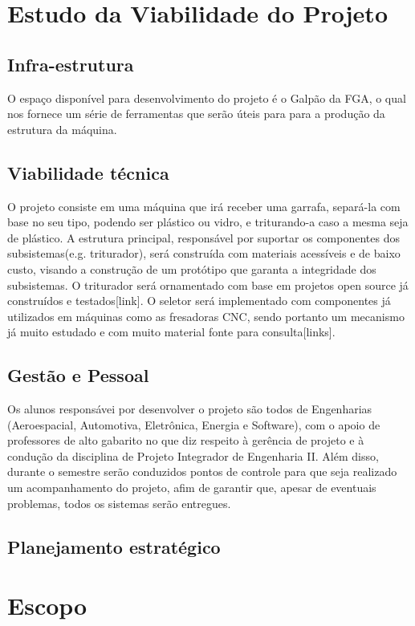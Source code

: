 \section{Estudo da Viabilidade do Projeto}

\subsection{Infra-estrutura}
    O espaço disponível para desenvolvimento do projeto é o Galpão da FGA, o qual nos fornece um série de ferramentas que serão úteis para para a produção da estrutura da máquina.

\subsection{Viabilidade técnica}
    O projeto consiste em uma máquina que irá receber uma garrafa, separá-la com base no seu tipo, podendo ser plástico ou vidro, e triturando-a caso a mesma seja de plástico. A estrutura principal, responsável por suportar os componentes dos subsistemas(e.g. triturador), será construída com materiais acessíveis e de baixo custo, visando a construção de um protótipo que garanta a integridade dos subsistemas. O triturador será ornamentado com base em projetos open source já construídos e testados[link]. O seletor será implementado com componentes já utilizados em máquinas como as fresadoras CNC, sendo portanto um mecanismo já muito estudado e com muito material fonte para consulta[links].

\subsection{Gestão e Pessoal}
    Os alunos responsávei por desenvolver o projeto são todos de Engenharias (Aeroespacial, Automotiva, Eletrônica, Energia e Software), com o apoio de professores de alto gabarito no que diz respeito à gerência de projeto e à condução da disciplina de Projeto Integrador de Engenharia II. Além disso, durante o semestre serão conduzidos pontos de controle para que seja realizado um acompanhamento do projeto, afim de garantir que, apesar de eventuais problemas, todos os sistemas serão entregues.

\subsection{Planejamento estratégico}

\section{Escopo}
